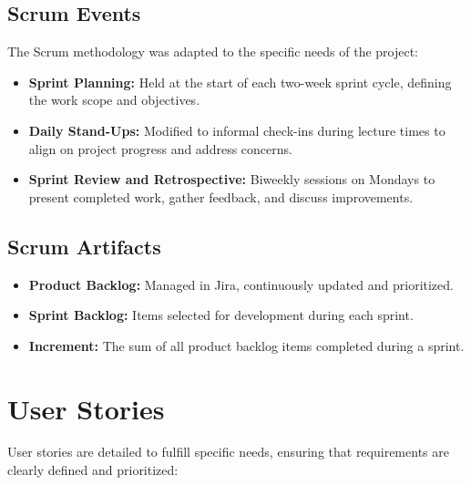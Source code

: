 \documentclass[11pt,a4paper]{article}
\begin{document}
    \subsection{Scrum Events}\label{subsec:scrum-events}
    The Scrum methodology was adapted to the specific needs of the project:
    \begin{itemize}
        \item \textbf{Sprint Planning:} Held at the start of each two-week sprint cycle, defining the work scope and objectives.
        \item \textbf{Daily Stand-Ups:} Modified to informal check-ins during lecture times to align on project progress and address concerns.
        \item \textbf{Sprint Review and Retrospective:} Biweekly sessions on Mondays to present completed work, gather feedback, and discuss improvements.
    \end{itemize}

    \subsection{Scrum Artifacts}\label{subsec:scrum-artifacts}
    \begin{itemize}
        \item \textbf{Product Backlog:} Managed in Jira, continuously updated and prioritized.
        \item \textbf{Sprint Backlog:} Items selected for development during each sprint.
        \item \textbf{Increment:} The sum of all product backlog items completed during a sprint.
    \end{itemize}

    \section{User Stories}\label{sec:user-stories}
    User stories are detailed to fulfill specific needs, ensuring that requirements are clearly defined and prioritized:
\end{document}
